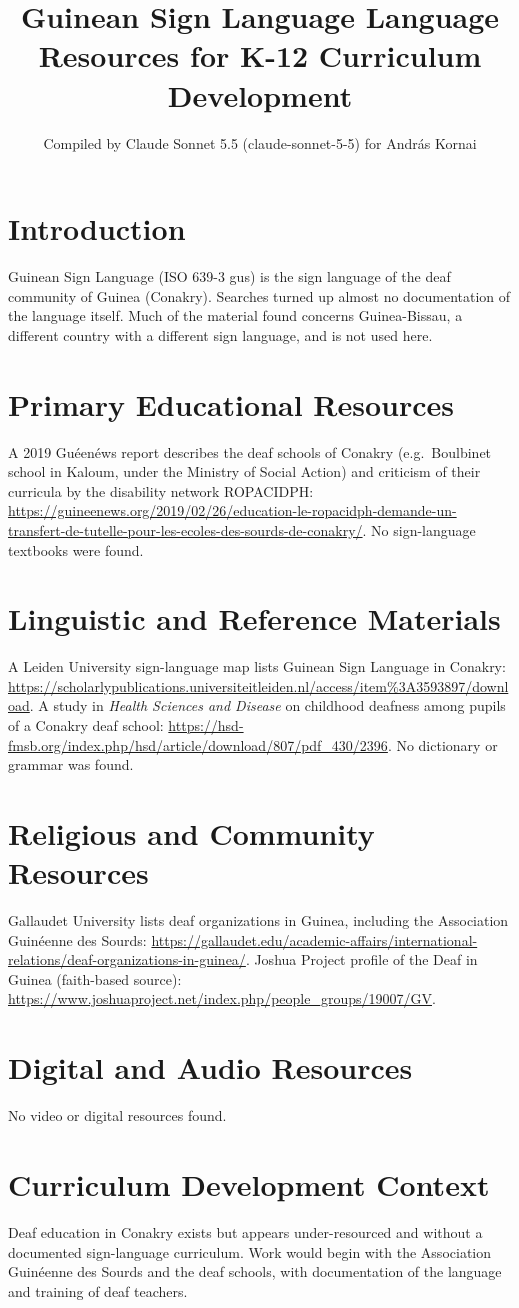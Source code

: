 \documentclass[12pt]{article}
\title{Guinean Sign Language Language Resources for K-12 Curriculum Development}
\author{Compiled by Claude Sonnet 5.5 (claude-sonnet-5-5) for Andr\'as Kornai}
\date{}
\begin{document}
\maketitle

\section{Introduction}
Guinean Sign Language (ISO 639-3 gus) is the sign language of the deaf community of Guinea (Conakry). Searches turned up almost no documentation of the language itself. Much of the material found concerns Guinea-Bissau, a different country with a different sign language, and is not used here.

\section{Primary Educational Resources}
A 2019 Gu\'een\'ews report describes the deaf schools of Conakry (e.g.\ Boulbinet school in Kaloum, under the Ministry of Social Action) and criticism of their curricula by the disability network ROPACIDPH: \url{https://guineenews.org/2019/02/26/education-le-ropacidph-demande-un-transfert-de-tutelle-pour-les-ecoles-des-sourds-de-conakry/}. No sign-language textbooks were found.

\section{Linguistic and Reference Materials}
A Leiden University sign-language map lists Guinean Sign Language in Conakry: \url{https://scholarlypublications.universiteitleiden.nl/access/item%3A3593897/download}. A study in \emph{Health Sciences and Disease} on childhood deafness among pupils of a Conakry deaf school: \url{https://hsd-fmsb.org/index.php/hsd/article/download/807/pdf_430/2396}. No dictionary or grammar was found.

\section{Religious and Community Resources}
Gallaudet University lists deaf organizations in Guinea, including the Association Guin\'eenne des Sourds: \url{https://gallaudet.edu/academic-affairs/international-relations/deaf-organizations-in-guinea/}. Joshua Project profile of the Deaf in Guinea (faith-based source): \url{https://www.joshuaproject.net/index.php/people_groups/19007/GV}.

\section{Digital and Audio Resources}
No video or digital resources found.

\section{Curriculum Development Context}
Deaf education in Conakry exists but appears under-resourced and without a documented sign-language curriculum. Work would begin with the Association Guin\'eenne des Sourds and the deaf schools, with documentation of the language and training of deaf teachers.
\end{document}
